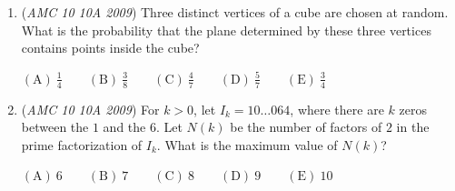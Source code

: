\begin{enumerate}
 $\mathrm{(A)}\ \frac{9}{2} \qquad \mathrm{(B)}\ \frac{50}{11} \qquad \mathrm{(C)}\ \frac{21}{4} \qquad \mathrm{(D)}\ \frac{17}{3} \qquad \mathrm{(E)}\ 6$


	\item (\textit{AMC 10 10A 2009}) Three distinct vertices of a cube are chosen at random. What is the probability that the plane determined by these three vertices contains points inside the cube?


 $\mathrm{(A)}\ \frac{1}{4} \qquad \mathrm{(B)}\ \frac{3}{8} \qquad \mathrm{(C)}\ \frac{4}{7} \qquad \mathrm{(D)}\ \frac{5}{7} \qquad \mathrm{(E)}\ \frac{3}{4}$


	\item (\textit{AMC 10 10A 2009}) For $k > 0$, let $I_k = 10\ldots 064$, where there are $k$ zeros between the $1$ and the $6$.  Let $N(k)$ be the number of factors of $2$ in the prime factorization of $I_k$.  What is the maximum value of $N(k)$?


 $\mathrm{(A)}\ 6 \qquad \mathrm{(B)}\ 7 \qquad \mathrm{(C)}\ 8 \qquad \mathrm{(D)}\ 9 \qquad \mathrm{(E)}\ 10$


\end{enumerate}